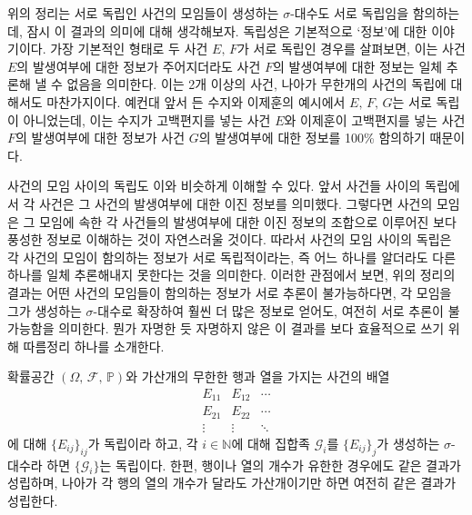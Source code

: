 위의 정리는 서로 독립인 사건의 모임들이 생성하는 $\sigma$-대수도 서로 독립임을 함의하는데, 잠시 이 결과의 의미에 대해 생각해보자. 독립성은 기본적으로 `정보'에 대한 이야기이다. 가장 기본적인 형태로 두 사건 $E,\,F$가 서로 독립인 경우를 살펴보면, 이는 사건 $E$의 발생여부에 대한 정보가 주어지더라도 사건 $F$의 발생여부에 대한 정보는 일체 추론해 낼 수 없음을 의미한다. 이는 2개 이상의 사건, 나아가 무한개의 사건의 독립에 대해서도 마찬가지이다. 예컨대 앞서 든 수지와 이제훈의 예시에서 $E,\,F,\,G$는 서로 독립이 아니었는데, 이는 수지가 고백편지를 넣는 사건 $E$와 이제훈이 고백편지를 넣는 사건 $F$의 발생여부에 대한 정보가 사건 $G$의 발생여부에 대한 정보를 100\% 함의하기 때문이다.

사건의 모임 사이의 독립도 이와 비슷하게 이해할 수 있다. 앞서 사건들 사이의 독립에서 각 사건은 그 사건의 발생여부에 대한 이진 정보를 의미했다. 그렇다면 사건의 모임은 그 모임에 속한 각 사건들의 발생여부에 대한 이진 정보의 조합으로 이루어진 보다 풍성한 정보로 이해하는 것이 자연스러울 것이다. 따라서 사건의 모임 사이의 독립은 각 사건의 모임이 함의하는 정보가 서로 독립적이라는, 즉 어느 하나를 알더라도 다른 하나를 일체 추론해내지 못한다는 것을 의미한다. 이러한 관점에서 보면, 위의 정리의 결과는 어떤 사건의 모임들이 함의하는 정보가 서로 추론이 불가능하다면, 각 모임을 그가 생성하는 $\sigma$-대수로 확장하여 훨씬 더 많은 정보로 얻어도, 여전히 서로 추론이 불가능함을 의미한다. 뭔가 자명한 듯 자명하지 않은 이 결과를 보다 효율적으로 쓰기 위해 따름정리 하나를 소개한다.

\begin{corollary}\label{cor:independence}
    확률공간 $(\Omega,\,\mathcal{F},\,\mathbb{P})$와 가산개의 무한한 행과 열을 가지는 사건의 배열
    \begin{equation*}
        \begin{matrix}
            E_{11}&E_{12}&\cdots\\
            E_{21}&E_{22}&\cdots\\
            \vdots&\vdots&\ddots
        \end{matrix}
    \end{equation*}
    에 대해 $\{E_{ij}\}_{ij}$가 독립이라 하고, 각 $i\in\mathbb{N}$에 대해 집합족 $\mathcal{G}_i$를 $\{E_{ij}\}_j$가 생성하는 $\sigma$-대수라 하면 $\{\mathcal{G}_i\}$는 독립이다. 한편, 행이나 열의 개수가 유한한 경우에도 같은 결과가 성립하며, 나아가 각 행의 열의 개수가 달라도 가산개이기만 하면 여전히 같은 결과가 성립한다.
\end{corollary}

